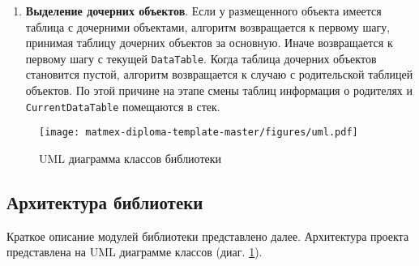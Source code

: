 \begin{enumerate}
    \item \textbf{Выделение дочерних объектов}. Если у размещенного объекта имеется таблица с дочерними объектами, алгоритм возвращается к первому шагу, принимая таблицу дочерних объектов за основную. Иначе возвращается к первому шагу с текущей \texttt{DataTable}. Когда таблица дочерних объектов становится пустой, алгоритм возвращается к случаю с родительской таблицей объектов. По этой причине на этапе смены таблиц информация о родителях и \texttt{CurrentDataTable} помещаются в стек.
    
\end{enumerate}

\begin{figure}
    \centering
    \texttt{[image: matmex-diploma-template-master/figures/uml.pdf]}
    \caption{UML диаграмма классов библиотеки}
    \label{fig:uml}
\end{figure}

\subsection{Архитектура библиотеки}

Краткое описание модулей библиотеки представлено далее. Архитектура проекта представлена на UML диаграмме классов (диаг. \ref{fig:uml}). 

